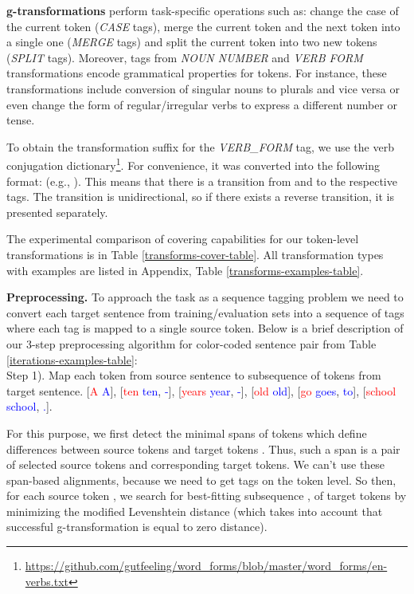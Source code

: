 \documentclass[11pt,a4paper]{article}
\begin{document}
\textbf{g-transformations} perform task-specific operations such as: change the case of the current token (\textit{CASE} tags), merge the current token and the next token into a single one (\textit{MERGE} tags) and split the current token into two new tokens (\textit{SPLIT} tags). Moreover, tags from \textit{NOUN NUMBER} and \textit{VERB FORM} transformations encode grammatical properties for tokens. For instance, these transformations include conversion of singular nouns to plurals and vice versa or even change the form of regular/irregular verbs to express a different number or tense.

To obtain the transformation suffix for the \textit{VERB\_FORM} tag, we use the verb conjugation dictionary\footnote{\url{https://github.com/gutfeeling/word_forms/blob/master/word_forms/en-verbs.txt}}. For convenience, it was converted into the following format:  (e.g., ). This means that there is a transition from  and  to the respective tags. The transition is unidirectional, so if there exists a reverse transition, it is presented separately.

The experimental comparison of covering capabilities for our token-level transformations is in Table \ref{transforms-cover-table}. All transformation types with examples are listed in Appendix, Table \ref{transforms-examples-table}.

 \textbf{Preprocessing.} To approach the task as a sequence tagging problem we need to convert each target sentence from training/evaluation sets into a sequence of tags where each tag is mapped to a single source token. Below is a brief description of our 3-step preprocessing algorithm for color-coded sentence pair from Table  \ref{iterations-examples-table}: \\


\indent Step 1). Map each token from source sentence to subsequence of tokens from target sentence.
[\textcolor{red}{A}  \textcolor{blue}{A}], [\textcolor{red}{ten}  \textcolor{blue}{ten}, \textcolor{blue}{-}], [\textcolor{red}{years}  \textcolor{blue}{year}, \textcolor{blue}{-}], 
[\textcolor{red}{old}  \textcolor{blue}{old}], [\textcolor{red}{go}  \textcolor{blue}{goes}, \textcolor{blue}{to}], [\textcolor{red}{school}  \textcolor{blue}{school}, \textcolor{blue}{.}].

For this purpose, we first detect the minimal spans of tokens which define differences between source tokens  and target tokens . Thus, such a span is a pair of selected source tokens and corresponding target tokens. We can't use these span-based alignments, because we need to get tags on the token level. So then, for each source token ,  we search for best-fitting subsequence ,  of target tokens by minimizing the modified Levenshtein distance (which takes into account that successful g-transformation is equal to zero distance).
\end{document}
